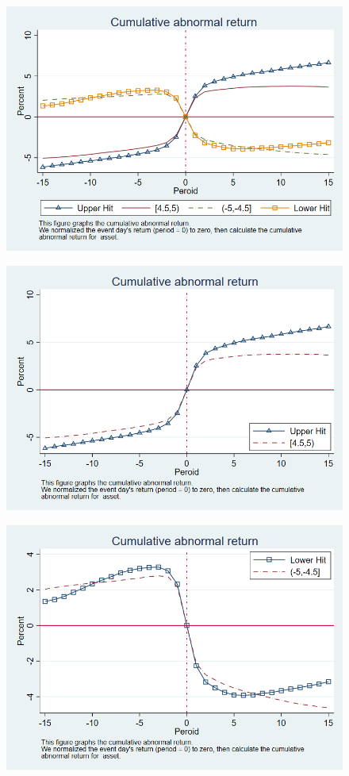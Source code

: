 \documentclass[12pt]{article}
\begin{document}
\begin{figure}[htbp]
\centering
\includegraphics[width=0.7\linewidth]{TAR}
\caption{}
\label{fig:tar}
\end{figure}

\begin{figure}[htbp]
\centering
\includegraphics[width=0.7\linewidth]{CUAR}
\caption{}
\label{fig:cuar}
\end{figure}

\begin{figure}[htbp]
\centering
\includegraphics[width=0.7\linewidth]{CLAR}
\caption{}
\label{fig:clar}
\end{figure}
\end{document}
